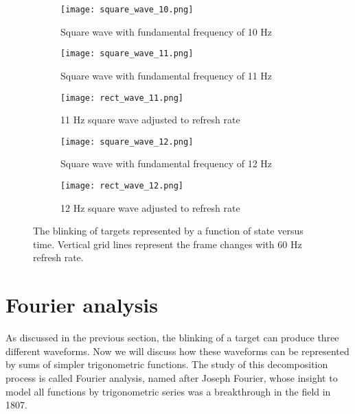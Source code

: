 
\begin{figure}[h!]
	\centering
	\begin{subfigure}{\textwidth}
		\texttt{[image: square\_wave\_10.png]}
		\caption{Square wave with fundamental frequency of 10 Hz}
		\label{fig:square_10}
	\end{subfigure}\vspace{10pt}
	\begin{subfigure}{\textwidth}
		\texttt{[image: square\_wave\_11.png]}
		\caption{Square wave with fundamental frequency of 11 Hz}
		\label{fig:square_11}
	\end{subfigure}\vspace{10pt}
	\begin{subfigure}{\textwidth}
		\texttt{[image: rect\_wave\_11.png]}
		\caption{11 Hz square wave adjusted to refresh rate}
		\label{fig:rect_11}
	\end{subfigure}\vspace{10pt}
	\begin{subfigure}{\textwidth}
		\texttt{[image: square\_wave\_12.png]}
		\caption{Square wave with fundamental frequency of 12 Hz}
		\label{fig:square_12}
	\end{subfigure}\vspace{10pt}
	\begin{subfigure}{\textwidth}
		\texttt{[image: rect\_wave\_12.png]}
		\caption{12 Hz square wave adjusted to refresh rate}
		\label{fig:rect_12}
	\end{subfigure}
	\caption{The blinking of targets represented by a function of state versus time. Vertical grid lines represent the frame changes with 60 Hz refresh rate.}
	\label{fig:square_waves}
\end{figure}

\section{Fourier analysis}

As discussed in the previous section, the blinking of a target can produce three different waveforms. Now we will discuss how these waveforms can be represented by sums of simpler trigonometric functions. The study of this decomposition process is called Fourier analysis, named after Joseph Fourier, whose insight to model all functions by trigonometric series was a breakthrough in the field in 1807.

